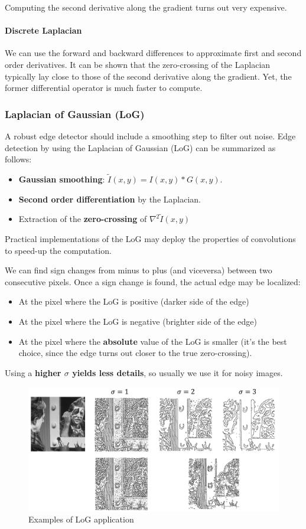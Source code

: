 \documentclass{article}
\begin{document}
Computing the second derivative along the gradient turns out very expensive.

\paragraph{Discrete Laplacian}
We can use the forward and backward differences to approximate first and second order derivatives.
It can be shown that the zero-crossing of the Laplacian typically lay close to those of the second derivative along the gradient.
Yet, the former differential operator is much faster to compute.

\subsubsection{Laplacian of Gaussian (LoG)}
A robust edge detector should include a smoothing step to filter out noise.
Edge detection by using the Laplacian of Gaussian (LoG) can be summarized as follows:
\begin{itemize}
  \item \textbf{Gaussian smoothing}: $\tilde{I}(x,y) = I(x,y) * G(x,y)$.
  \item \textbf{Second order differentiation} by the Laplacian.
  \item Extraction of the \textbf{zero-crossing} of $\nabla^2 \tilde{I}(x,y)$
\end{itemize}

Practical implementations of the LoG may deploy the properties of convolutions to speed-up the computation.

We can find sign changes from minus to plus (and viceversa) between two consecutive pixels.
Once a sign change is found, the actual edge may be localized:
\begin{itemize}
  \item At the pixel where the LoG is positive (darker side of the edge)
  \item At the pixel where the LoG is negative (brighter side of the edge)
  \item At the pixel where the \textbf{absolute} value of the LoG is smaller (it's the best choice, since the edge turns out closer to the true zero-crossing).
\end{itemize}

Using a \textbf{higher $\sigma$ yields less details}, so usually we use it for noisy images.

\begin{figure}[htbp]
  \centering
  \includegraphics[width=0.7\linewidth]{./img/log_application.jpg}
  \caption{Examples of LoG application}
  \label{fig:log_application}
\end{figure}
\end{document}
